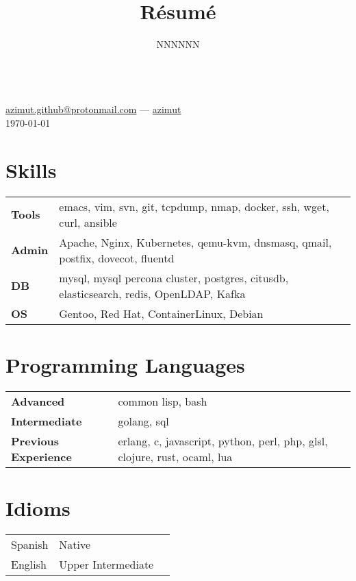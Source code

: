 \documentclass[11pt]{article}
\makeatletter
\renewcommand{\maketitle}{
  \begin{center}{\huge\bfseries\theauthor} \\
    \vspace{.25em}
    {\faEnvelope} \href {mailto:azimut.github@protonmail.com} {azimut.github@protonmail.com}
    ---
    {\faGithub} \href {https://github.com/azimut} {azimut} \\
    \vspace{.25em}
    \today
  \end{center}
}
\makeatother
\begin{document}
\title{R\'esum\'e}
\author{NNNNNN}
\maketitle


\section{Skills}


\begin{tabular}{@{}lll@{}}
  \hspace{.1em} \textbf{Tools} & emacs, vim, svn, git, tcpdump, nmap, docker, ssh, wget, curl, ansible \\
  \hspace{.1em} \textbf{Admin} & Apache, Nginx, Kubernetes, qemu-kvm, dnsmasq, qmail, postfix, dovecot, fluentd \\
  \hspace{.1em} \textbf{DB}    & mysql, mysql percona cluster, postgres, citusdb, elasticsearch, redis, OpenLDAP, Kafka \\
  \hspace{.1em} \textbf{OS}    & Gentoo, Red Hat, ContainerLinux, Debian \\
\end{tabular}


\section{Programming Languages}


\begin{tabular}{@{}lll@{}}
  \hspace{.1em} \textbf{Advanced} & common lisp, bash \\
  \hspace{.1em} \textbf{Intermediate} & golang, sql \\
  \hspace{.1em} \textbf{Previous Experience} & erlang, c, javascript, python, perl, php, glsl, clojure, rust, ocaml, lua \\
\end{tabular}


\section{Idioms}


\begin{tabular}{@{}lll@{}}
  \hspace{.1em} Spanish & Native \\
  \hspace{.1em} English & Upper Intermediate
  \\
\end{tabular}
\end{document}
